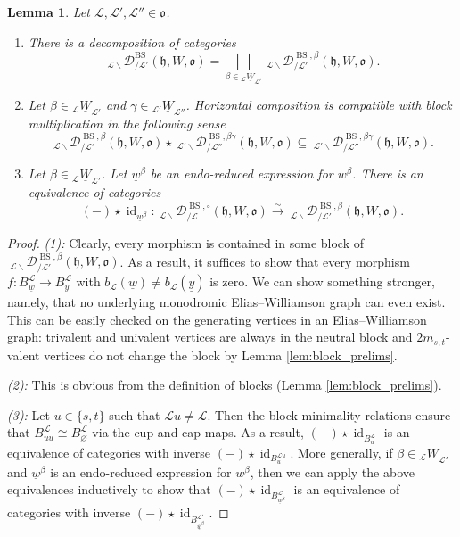 \documentclass{amsart}
\newcommand{\scrL}{\mathcal{L}}
\DeclareMathOperator{\id}{id}
\newcommand{\fr}[1]{\mathfrak{#1}}
\DeclareMathOperator{\BS}{BS}
\newcommand{\EWmon}[2]{\:_{#1 \backslash} \mathcal{D}_{/ #2} }
\newcommand{\uW}[2]{{}_{#1}\underline{W}_{#2}}
\newcommand{\uw}{\underline{w}}
\newcommand{\uy}{\underline{y}}
\renewcommand{\emptyset}{\varnothing}
\newtheorem{lemma}[subsubsection]{Lemma}
\theoremstyle{definition}
\numberwithin{equation}{subsection}
\begin{document}
\begin{lemma}\label{lem:dihedral_facts_about_blocks}
    Let $\scrL, \scrL', \scrL'' \in \fr{o}$.
    \begin{enumerate}
        \item There is a decomposition of categories
    \[\EWmon{\scrL}{\scrL'}^{\BS} (\fr{h}, W, \fr{o}) = \bigsqcup_{\beta \in \uW{\scrL}{\scrL'}} \EWmon{\scrL}{\scrL'}^{\BS, \beta} (\fr{h}, W, \fr{o}).\]
        \item Let $\beta \in \uW{\scrL}{\scrL'}$ and $\gamma \in \uW{\scrL'}{\scrL''}$. Horizontal composition is compatible with block multiplication in the following sense
        \[\EWmon{\scrL}{\scrL'}^{\BS, \beta} (\fr{h}, W, \fr{o}) \star \EWmon{\scrL'}{\scrL''}^{\BS, \beta \gamma} (\fr{h}, W, \fr{o}) \subseteq \EWmon{\scrL'}{\scrL''}^{\BS, \beta \gamma} (\fr{h}, W, \fr{o}).\]
        \item Let $\beta \in \uW{\scrL}{\scrL'}$. Let $\uw^{\beta}$ be an endo-reduced expression for $w^{\beta}$. There is an equivalence of categories
        \[ (-) \star \id_{\uw^{\beta}} : \EWmon{\scrL}{\scrL}^{\BS, \circ} (\fr{h}, W, \fr{o})  \stackrel{\sim}{\to} \EWmon{\scrL}{\scrL'}^{\BS, \beta} (\fr{h}, W, \fr{o}).\]
    \end{enumerate}
\end{lemma}
\begin{proof}
    \emph{(1): } Clearly, every morphism is contained in some block of $\EWmon{\scrL}{\scrL'}^{\BS, \beta} (\fr{h}, W, \fr{o})$.
    As a result, it suffices to show that every morphism $f : B_{\uw}^{\scrL} \to B_{\uy}^{\scrL}$ with $b_{\scrL} (\uw) \neq b_{\scrL} (\uy)$ is zero.
    We can show something stronger, namely, that no underlying monodromic Elias--Williamson graph can even exist.
    This can be easily checked on the generating vertices in an Elias--Williamson graph: trivalent and univalent vertices are always in the neutral block and $2m_{s,t}$-valent vertices do not change the block by Lemma \ref{lem:block_prelims}.

    \emph{(2): } This is obvious from the definition of blocks (Lemma \ref{lem:block_prelims}).

    \emph{(3): } Let $u \in \{s,t\}$ such that $\scrL u \neq \scrL$.
    Then the block minimality relations ensure that $B_{uu}^{\scrL} \cong B_{\emptyset}^{\scrL}$ via the cup and cap maps.
    As a result, $(-) \star \id_{B_{u}^{\scrL}}$ is an equivalence of categories with inverse $(-) \star \id_{B_{u}^{\scrL u}}$.
    More generally, if $\beta \in \uW{\scrL}{\scrL'}$ and $\uw^{\beta}$ is an endo-reduced expression for $w^{\beta}$, then we can apply the above equivalences inductively to show that
    $(-) \star \id_{B_{\uw^{\beta}}^{\scrL}}$ is an equivalence of categories with inverse $(-) \star \id_{B_{\overline{\uw}^{\beta}}^{\scrL'}}$.
\end{proof}
\end{document}
